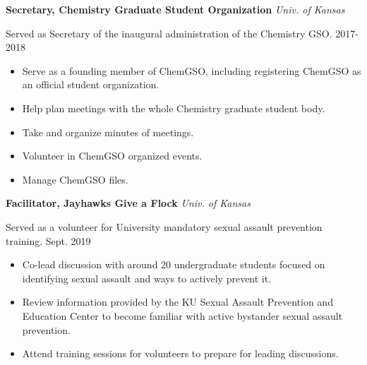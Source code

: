 {\bf Secretary, Chemistry Graduate Student Organization} \hfill \textit{Univ. of Kansas}

Served as Secretary of the inaugural administration of the Chemistry GSO. \hfill 2017-2018

\begin{itemize}[rightmargin=\dimexpr\linewidth-10cm-\leftmargin\relax,noitemsep,topsep=0cm]
\raggedright
    \item Serve as a founding member of ChemGSO, including registering ChemGSO as an official student organization.
    \item Help plan meetings with the whole Chemistry graduate student body.
    \item Take and organize minutes of meetings.
    \item Volunteer in ChemGSO organized events.
    \item Manage ChemGSO files.
\end{itemize}

\vspace{\y}
{\bf Facilitator, Jayhawks Give a Flock} \hfill \textit{Univ. of Kansas}

Served as a volunteer for University mandatory sexual assault prevention training. \hfill Sept. 2019

\begin{itemize}[rightmargin=\dimexpr\linewidth-10cm-\leftmargin\relax,noitemsep,topsep=0cm]
\raggedright
  \item Co-lead discussion with around 20 undergraduate students focused on identifying sexual assault and ways to actively prevent it.
  \item Review information provided by the KU Sexual Assault Prevention and Education Center to become familiar with active bystander sexual assault prevention.
  \item Attend training sessions for volunteers to prepare for leading discussions.
\end{itemize}
